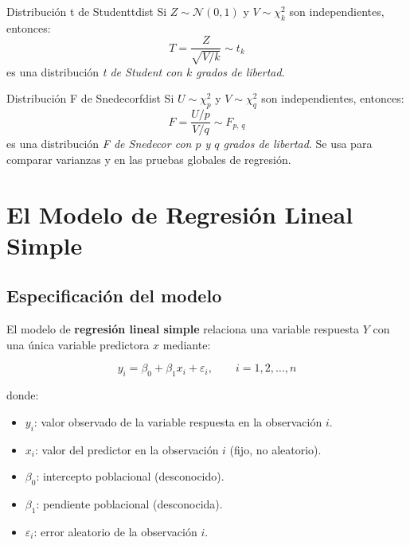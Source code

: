 \documentclass[12pt, a4paper]{article}
\begin{document}
\begin{definicion}{Distribución t de Student}{tdist}
Si $Z \sim \mathcal{N}(0,1)$ y $V \sim \chi^2_k$ son independientes, entonces:
\[
  T = \frac{Z}{\sqrt{V/k}} \sim t_k
\]
es una distribución \emph{t de Student con $k$ grados de libertad}.
\end{definicion}

\begin{definicion}{Distribución F de Snedecor}{fdist}
Si $U \sim \chi^2_p$ y $V \sim \chi^2_q$ son independientes, entonces:
\[
  F = \frac{U/p}{V/q} \sim F_{p,\,q}
\]
es una distribución \emph{F de Snedecor con $p$ y $q$ grados de libertad}.
Se usa para comparar varianzas y en las pruebas globales de regresión.
\end{definicion}


\section{El Modelo de Regresión Lineal Simple}

\subsection{Especificación del modelo}

El modelo de \textbf{regresión lineal simple} relaciona una variable respuesta $Y$ con una única variable predictora $x$ mediante:

\begin{equation}\label{eq:modelo}
  y_i = \beta_0 + \beta_1 x_i + \varepsilon_i,
  \qquad i = 1, 2, \ldots, n
\end{equation}

donde:
\begin{itemize}[nosep]
  \item $y_i$: valor observado de la variable respuesta en la observación $i$.
  \item $x_i$: valor del predictor en la observación $i$ (fijo, no aleatorio).
  \item $\beta_0$: intercepto poblacional (desconocido).
  \item $\beta_1$: pendiente poblacional (desconocida).
  \item $\varepsilon_i$: error aleatorio de la observación $i$.
\end{itemize}
\end{document}
